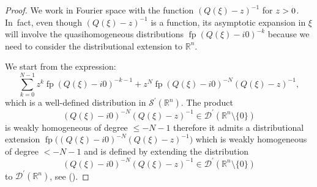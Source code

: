 \documentclass[JEP,XML,SOM,Unicode]{cedram}
\let\pazocal\mathscr
\theoremstyle{definition}
\let\Im\relax
\DeclareMathOperator{\Im}{Im}
\DeclareMathOperator*{\pf}{fp}
\begin{document}
\begin{proof}
We work in Fourier space with
the function $\left(Q(\xi)-z\right)^{-1}$ for $\Im z>0$.
In~fact, even though $\left(Q(\xi)-z\right)^{-1}$ is a function, its asymptotic expansion in $\xi$ will involve the quasihomogeneous distributions
$\pf(Q(\xi)-i0)^{-k}$
because we need to consider the distributional extension to $\mathbb{R}^n$.

We start from the expression:
\[
\sum_{k=0}^{N-1} z^k\pf \left(Q(\xi)-i0\right)^{-k-1}+z^N\pf\left(Q(\xi)-i0\right)^{-N} \left(Q(\xi)-z\right)^{-1},
\]
which is a well-defined
distribution in $\pazocal{S}^\prime(\mathbb{R}^n)$.
The product
\[
\left(Q(\xi)-i0\right)^{-N} \left(Q(\xi)-z\right)^{-1} \in \pazocal{D}^\prime(\mathbb{R}^n\setminus\{0\})
\]
is weakly homogeneous of degree $\leqslant -N-1 $ therefore it admits a distributional extension
$\pf\bigl(\left(Q(\xi)-i0\right)^{-N} \left(Q(\xi)-z\right)^{-1}\bigr)$ which is weakly homogeneous of degree $<-N-1$ and is defined by extending the distribution
\[
\left(Q(\xi)-i0\right)^{-N} \left(Q(\xi)-z\right)^{-1}\in \pazocal{D}^\prime(\mathbb{R}^n\setminus\{0\})
\]
to $\pazocal{D}^\prime(\mathbb{R}^n)$, see \cite[Th.\,1.7]{DangAHP} (\cf \cite{Meyer}).


\end{proof}
\end{document}
